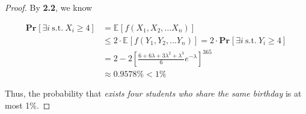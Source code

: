 \documentclass{article}
\renewcommand{\Pr}[2]{\mathbf{Pr}_{#1}\left[#2\right]}
\newcommand{\staExp}[2]{\mathbb{E}_{#1}\left[#2\right]}
\begin{document}
\begin{proof}
    \hspace{1.3em}
    By \textbf{2.2}, we know
    
    \vspace{-2.5em}
    \begin{align*}
        \Pr{}{\exists i\ \mathrm{s.t.}\ X_i\geq4} &=\staExp{}{f(X_1,X_2,...X_n)} \\
        &\le 2\cdot\staExp{}{f(Y_1,Y_2,...Y_n)}=2\cdot\Pr{}{\exists i\ \mathrm{s.t.}\ Y_i\geq4}\\
        &=2-2\left[\frac{6+6\lambda+3\lambda^2+\lambda^3}{6}e^{-\lambda}\right]^{365} \\
        &\approx 0.9578\%<1\%
    \end{align*}
    
    \hspace{1.3em}
    Thus, the probability that \textit{exists four students who share the same birthday} is at most 1\%.
\end{proof}
    
\end{document}
